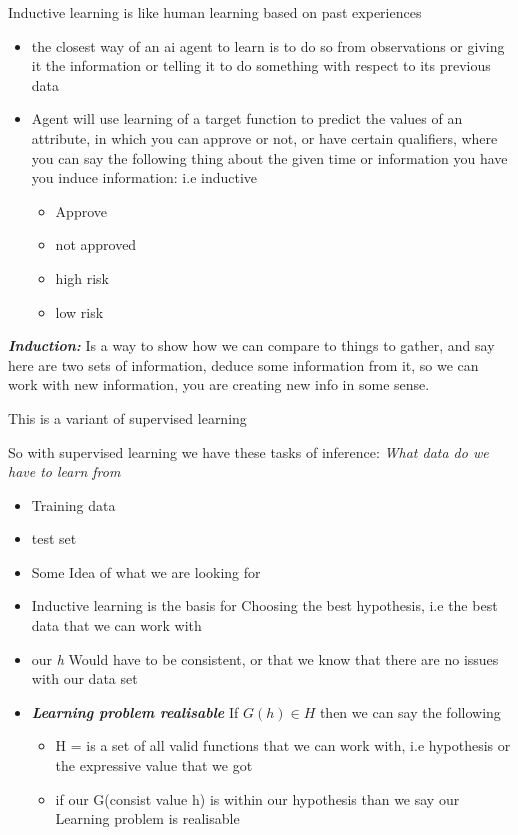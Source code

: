 \documentclass{article}
\theoremstyle{mytheoremstyle}
\theoremstyle{mytheoremstyle}
\theoremstyle{myproblemstyle}
\begin{document}
\begin{definition}
	Inductive learning is like human learning based on past experiences
	\begin{itemize}
		\item the closest way of an ai agent to learn is to do so from observations or giving it the information or telling it to do something with respect to its previous data
		\item Agent will use learning of a target function to predict the values of an attribute, in which you can approve or not, or have certain qualifiers, where you can say the following thing about the given time or information you have you induce information: i.e inductive
		      \begin{itemize}
			      \item Approve
			      \item not approved
			      \item high risk
			      \item low risk
		      \end{itemize}

	\end{itemize}
	\textbf{\textit{Induction:}} Is a way to show how we can compare to things to gather, and say here are two sets of information, deduce some information from it, so we can work with new information, you are creating new info in some sense.

	This is a variant of supervised learning
\end{definition}
So with supervised learning we have these tasks of inference: \textit{What data do we have to learn from }

\begin{itemize}
	\item Training data
	\item test set
	\item Some Idea of what we are looking for
\end{itemize}



\begin{itemize}
	\item Inductive learning is the basis for Choosing the best hypothesis, i.e the best data that we can work with
	\item our \textit{h } Would have to be consistent, or that we know that there are no issues with our data set
	\item \textbf{\textit{Learning problem realisable}} If \( G(h) \in H  \)  then we can say the following
	      \begin{itemize}
		      \item H = is a set of all valid functions that we can work with, i.e hypothesis or the expressive value that we got
		      \item if our G(consist value h) is within our hypothesis than we say our Learning problem is realisable
	      \end{itemize}
\end{itemize}
\end{document}
